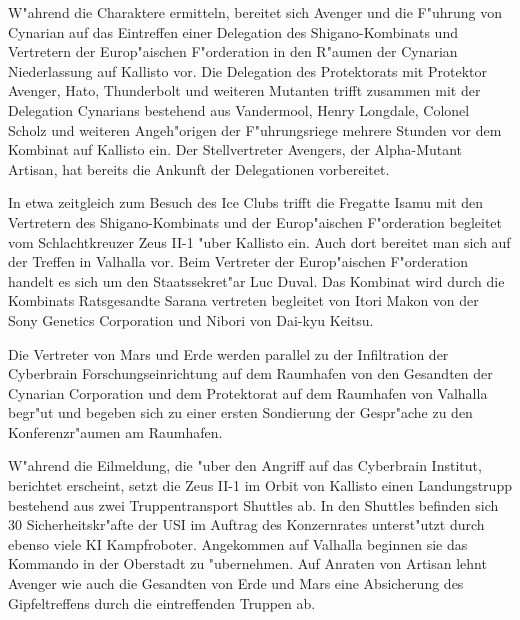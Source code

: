 
W"ahrend die Charaktere ermitteln, bereitet sich Avenger und die F"uhrung von Cynarian auf das Eintreffen einer Delegation des 
Shigano-Kombinats und Vertretern der Europ"aischen F"orderation in den R"aumen der Cynarian Niederlassung auf Kallisto vor. Die Delegation des Protektorats mit Protektor Avenger, Hato, Thunderbolt und weiteren Mutanten trifft zusammen mit der Delegation Cynarians bestehend aus Vandermool, Henry Longdale, Colonel Scholz und weiteren Angeh"origen der F"uhrungsriege mehrere Stunden vor dem Kombinat auf Kallisto ein. Der Stellvertreter Avengers, der Alpha-Mutant Artisan, hat bereits die Ankunft der Delegationen vorbereitet.

In etwa zeitgleich zum Besuch des Ice Clubs trifft die Fregatte Isamu mit den Vertretern des Shigano-Kombinats und der Europ"aischen F"orderation begleitet vom Schlachtkreuzer Zeus II-1 "uber Kallisto ein. Auch dort bereitet man sich auf der Treffen in Valhalla vor.
Beim Vertreter der Europ"aischen F"orderation handelt es sich um den Staatssekret"ar Luc Duval. Das Kombinat wird durch die Kombinats Ratsgesandte Sarana vertreten begleitet von Itori Makon von der Sony Genetics Corporation und Nibori von Dai-kyu Keitsu.

Die Vertreter von Mars und Erde werden parallel zu der Infiltration der Cyberbrain Forschungseinrichtung auf dem Raumhafen von den Gesandten der Cynarian Corporation und dem Protektorat auf dem Raumhafen von Valhalla begr"u\3t und begeben sich zu einer ersten Sondierung der Gespr"ache zu den Konferenzr"aumen am Raumhafen.


W"ahrend die Eilmeldung, die "uber den Angriff auf das Cyberbrain Institut, berichtet erscheint, setzt die Zeus II-1 im Orbit von Kallisto einen Landungstrupp bestehend aus zwei Truppentransport Shuttles ab. In den Shuttles befinden sich 30 Sicherheitskr"afte der USI im Auftrag des Konzernrates unterst"utzt durch ebenso viele KI Kampfroboter. Angekommen auf Valhalla beginnen sie das Kommando in der Oberstadt zu "ubernehmen. Auf Anraten von Artisan lehnt Avenger wie auch die Gesandten von Erde und Mars eine Absicherung des Gipfeltreffens durch die eintreffenden Truppen ab.


